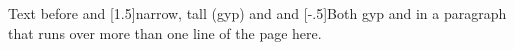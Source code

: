 \documentclass{article}
\begin{document}
Text before  and \scalebox{.5}[1.5]{narrow, tall (gyp)} and  and \scalebox{-2}[-.5]{Both gyp} and  in a paragraph that runs over more than one line of the page here.
\end{document}
